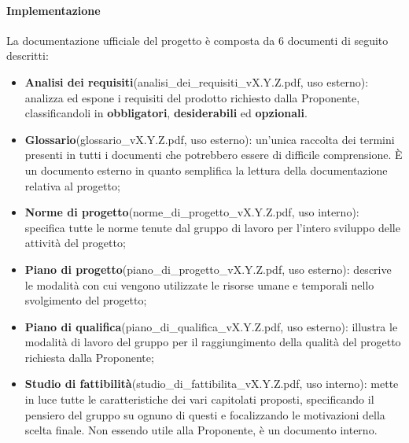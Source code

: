 		\paragraph{Implementazione}
		La documentazione ufficiale del progetto è composta da 6 documenti di seguito descritti:
		\begin{itemize}
			\item \textbf{Analisi dei requisiti}(analisi\_dei\_requisiti\_vX.Y.Z.pdf, uso esterno): analizza ed espone i requisiti del prodotto richiesto dalla Proponente, classificandoli in \textbf{obbligatori}, \textbf{desiderabili} ed \textbf{opzionali}.
			\item \textbf{Glossario}(glossario\_vX.Y.Z.pdf, uso esterno): un'unica raccolta dei termini presenti in tutti i documenti che potrebbero essere di difficile comprensione. È un documento esterno in quanto semplifica la lettura della documentazione relativa al progetto;
			\item \textbf{Norme di progetto}(norme\_di\_progetto\_vX.Y.Z.pdf, uso interno): specifica tutte le norme tenute dal gruppo di lavoro per l'intero sviluppo delle attività del progetto;
			\item \textbf{Piano di progetto}(piano\_di\_progetto\_vX.Y.Z.pdf, uso esterno): descrive le modalità con cui vengono utilizzate le risorse umane e temporali nello svolgimento del progetto;
			\item \textbf{Piano di qualifica}(piano\_di\_qualifica\_vX.Y.Z.pdf, uso esterno): illustra le modalità di lavoro del gruppo per il raggiungimento della qualità del progetto richiesta dalla Proponente;
			\item \textbf{Studio di fattibilità}(studio\_di\_fattibilita\_vX.Y.Z.pdf, uso interno): mette in luce tutte le caratteristiche dei vari capitolati proposti, specificando il pensiero del gruppo su ognuno di questi e focalizzando le motivazioni della scelta finale. Non essendo utile alla Proponente, è un documento interno.
		\end{itemize}
		
